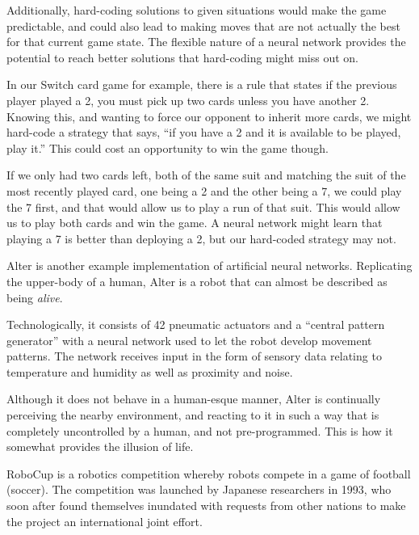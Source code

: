 \documentclass[12pt,a4paper]{article}
\begin{document}
Additionally, hard-coding solutions to given situations would make the game predictable, and could also lead to making moves that are not actually the best for that current game state. The flexible nature of a neural network provides the potential to reach better solutions that hard-coding might miss out on. 

In our Switch card game for example, there is a rule that states if the previous player played a 2, you must pick up two cards unless you have another 2. Knowing this, and wanting to force our opponent to inherit more cards, we might hard-code a strategy that says, \enquote{if you have a 2 and it is available to be played, play it.} This could cost an opportunity to win the game though. 

If we only had two cards left, both of the same suit and matching the suit of the most recently played card, one being a 2 and the other being a 7, we could play the 7 first, and that would allow us to play a run of that suit. This would allow us to play both cards and win the game. A neural network might learn that playing a 7 is better than deploying a 2, but our hard-coded strategy may not.


Alter\citep{21} is another example implementation of artificial neural networks. Replicating the upper-body of a human, Alter is a robot that can almost be described as being \textit{alive}. 

Technologically, it consists of 42 pneumatic actuators and a \enquote{central pattern generator} with a neural network used to let the robot develop movement patterns\citep{21}. The network receives input in the form of sensory data relating to temperature and humidity as well as proximity and noise\citep{22}. 

Although it does not behave in a human-esque manner, Alter is continually perceiving the nearby environment, and reacting to it in such a way that is completely uncontrolled by a human, and not pre-programmed. This is how it somewhat provides the illusion of life. 

RoboCup\citep{23} is a robotics competition whereby robots compete in a game of football (soccer). The competition was launched by Japanese researchers in 1993, who soon after found themselves inundated with requests from other nations to make the project an international joint effort\citep{23}. 
\end{document}
